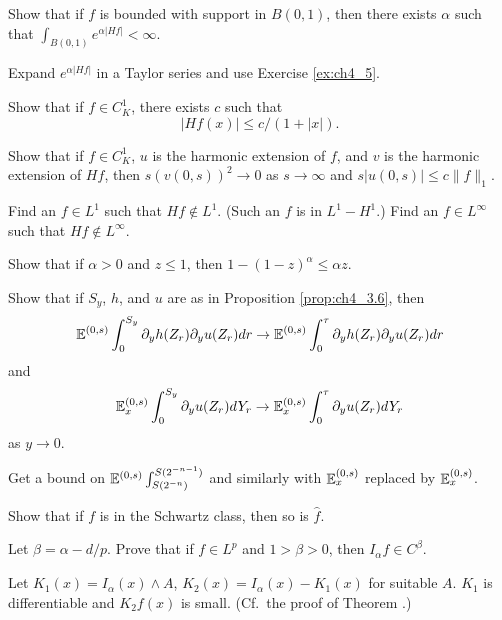 \begin{exercise}\label{ex:ch4_6}
Show that if $f$ is bounded with support in $B(0,1)$, then there exists $\alpha$ such that $\int_{B(0,1)} e^{\alpha|Hf|} < \infty$.

\hint Expand $e^{\alpha|Hf|}$ in a Taylor series and use Exercise \ref{ex:ch4_5}.
\end{exercise}

\begin{exercise}\label{ex:ch4_7}
Show that if $f \in C_K^1$, there exists $c$ such that
\[
    |Hf(x)| \leq c/(1 + |x|).
\]
\end{exercise}

\begin{exercise}\label{ex:ch4_8}
Show that if $f \in C_K^1$, $u$ is the harmonic extension of $f$, and $v$ is the harmonic extension of $Hf$, then $s(v(0,s))^2 \to 0$ as $s \to \infty$ and $s|u(0,s)| \leq c\|f\|_1$.
\end{exercise}

\begin{exercise}\label{ex:ch4_9}
Find an $f \in L^1$ such that $Hf \notin L^1$. (Such an $f$ is in $L^1 - H^1$.) Find an $f \in L^\infty$ such that $Hf \notin L^\infty$.
\end{exercise}

\begin{exercise}\label{ex:ch4_10}
Show that if $\alpha > 0$ and $z \leq 1$, then $1-(1-z)^\alpha \leq \alpha z$.
\end{exercise}

\begin{exercise}\label{ex:ch4_11}
Show that if $S_y$, $h$, and $u$ are as in Proposition \ref{prop:ch4_3.6}, then
\[
    \mathbb{E}^{(0,s)} \int_0^{S_y} \partial_yh(Z_r)\partial_yu(Z_r) dr \to \mathbb{E}^{(0,s)} \int_0^\tau \partial_yh(Z_r)\partial_yu(Z_r) dr
\]
and
\[
    \mathbb{E}_x^{(0,s)} \int_0^{S_y} \partial_yu(Z_r)dY_r \to \mathbb{E}_x^{(0,s)} \int_0^\tau \partial_yu(Z_r)dY_r
\]
as $y \to 0$.

\hint Get a bound on $\mathbb{E}^{(0,s)} \int_{S(2^{-n})}^{S(2^{-n-1})}$ and similarly with $\mathbb{E}^{(0,s)}_x$ replaced by $\mathbb{E}_x^{(0,s)}$.
\end{exercise}

\begin{exercise}\label{ex:ch4_12}
Show that if $f$ is in the Schwartz class, then so is $\widehat{f}$.
\end{exercise}

\begin{exercise}\label{ex:ch4_13}
Let $\beta = \alpha - d/p$. Prove that if $f \in L^p$ and $1 > \beta > 0$, then $I_\alpha f \in C^\beta$.

\hint Let $K_1(x) = I_\alpha(x) \wedge A$, $K_2(x) = I_\alpha(x) - K_1(x)$ for suitable $A$. $K_1$ is differentiable and $K_2f(x)$ is small. (Cf.\ the proof of Theorem .)
\end{exercise}

